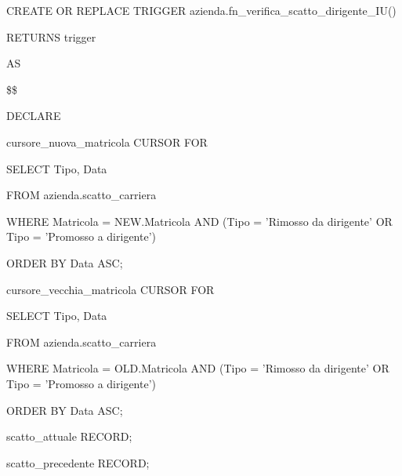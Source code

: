             \begin{flushleft}
                \begin{description}
                    \item CREATE OR REPLACE TRIGGER azienda.fn\_verifica\_scatto\_dirigente\_IU()  
                    \item RETURNS trigger
                    \item AS
                    \item \$\$
                    \item DECLARE
                        \begin{description}
                            \item cursore\_nuova\_matricola CURSOR FOR
                            \begin{description}
                                \item SELECT Tipo, Data
                                \item FROM azienda.scatto\_carriera
                                \item WHERE Matricola = NEW.Matricola AND (Tipo = 'Rimosso da dirigente' OR Tipo = 'Promosso a dirigente')
                                \item ORDER BY Data ASC;         
                            \end{description}

                            \vspace{0.5cm}

                            \item cursore\_vecchia\_matricola CURSOR FOR
                            \begin{description}
                                \item SELECT Tipo, Data
                                \item FROM azienda.scatto\_carriera
                                \item WHERE Matricola = OLD.Matricola AND (Tipo = 'Rimosso da dirigente' OR Tipo = 'Promosso a dirigente')
                                \item ORDER BY Data ASC;
                            \end{description}

                            \item scatto\_attuale RECORD;
                            \item scatto\_precedente RECORD;
                            

\end{description}
\end{description}
\end{flushleft}
